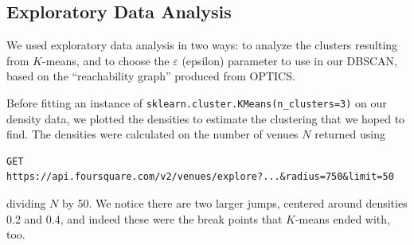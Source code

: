 \documentclass{article}
\begin{document}
\begin{itemize}
%
\end{itemize}

\newpage

\subsection{Exploratory Data Analysis}

We used exploratory data analysis in two ways: to analyze the clusters resulting from $K$-means, and to choose the $\varepsilon$ (epsilon) parameter to use in our DBSCAN, based on the ``reachability graph'' produced from OPTICS. 

 Before fitting an instance of {\tt sklearn.cluster.KMeans(n\_clusters=3)} on our density data, we plotted the densities to estimate the clustering that we hoped to find. The densities were calculated on the number of venues $N$ returned using 
\begin{verbatim}GET https://api.foursquare.com/v2/venues/explore?...&radius=750&limit=50\end{verbatim}
dividing $N$ by 50. We notice there are two larger jumps, centered around densities 0.2 and 0.4, and indeed these were the break points that $K$-means ended with, too. 
\end{document}

